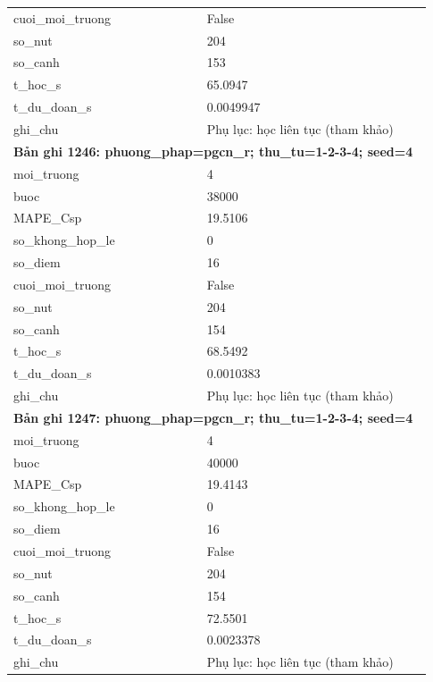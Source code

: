 \begin{longtable}{p{0.43\linewidth}p{0.50\linewidth}}
cuoi\_\allowbreak moi\_\allowbreak truong & False \\
so\_\allowbreak nut & 204 \\
so\_\allowbreak canh & 153 \\
t\_\allowbreak hoc\_\allowbreak s & 65.0947 \\
t\_\allowbreak du\_\allowbreak doan\_\allowbreak s & 0.0049947 \\
ghi\_\allowbreak chu & Phụ lục: học liên tục (tham khảo) \\
\midrule
\multicolumn{2}{p{0.95\linewidth}}{\textbf{Bản ghi 1246: phuong\_phap=pgcn\_r; thu\_tu=1-2-3-4; seed=4}} \\
moi\_\allowbreak truong & 4 \\
buoc & 38000 \\
MAPE\_\allowbreak Csp & 19.5106 \\
so\_\allowbreak khong\_\allowbreak hop\_\allowbreak le & 0 \\
so\_\allowbreak diem & 16 \\
cuoi\_\allowbreak moi\_\allowbreak truong & False \\
so\_\allowbreak nut & 204 \\
so\_\allowbreak canh & 154 \\
t\_\allowbreak hoc\_\allowbreak s & 68.5492 \\
t\_\allowbreak du\_\allowbreak doan\_\allowbreak s & 0.0010383 \\
ghi\_\allowbreak chu & Phụ lục: học liên tục (tham khảo) \\
\midrule
\multicolumn{2}{p{0.95\linewidth}}{\textbf{Bản ghi 1247: phuong\_phap=pgcn\_r; thu\_tu=1-2-3-4; seed=4}} \\
moi\_\allowbreak truong & 4 \\
buoc & 40000 \\
MAPE\_\allowbreak Csp & 19.4143 \\
so\_\allowbreak khong\_\allowbreak hop\_\allowbreak le & 0 \\
so\_\allowbreak diem & 16 \\
cuoi\_\allowbreak moi\_\allowbreak truong & False \\
so\_\allowbreak nut & 204 \\
so\_\allowbreak canh & 154 \\
t\_\allowbreak hoc\_\allowbreak s & 72.5501 \\
t\_\allowbreak du\_\allowbreak doan\_\allowbreak s & 0.0023378 \\
ghi\_\allowbreak chu & Phụ lục: học liên tục (tham khảo) \\

\end{longtable}
